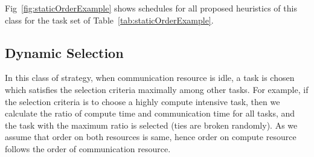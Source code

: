\documentclass[sigconf]{acmart}
\begin{document}
	Fig~\ref{fig:staticOrderExample} shows schedules for all proposed heuristics of this class for the task set of Table~\ref{tab:staticOrderExample}.
	\subsection{Dynamic Selection}
	
	In this class of strategy, when communication resource is idle, a task is chosen which satisfies the selection criteria maximally among other tasks. For example, if the selection criteria is to choose a highly compute intensive task, then we calculate the ratio of compute time and communication time for all tasks, and the task with the maximum ratio is selected (ties are broken randomly). As we assume that order on both resources is same, hence order on compute resource follows the order of communication resource.
	
\end{document}
